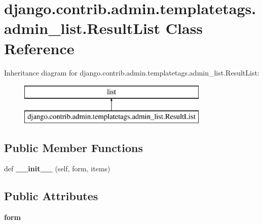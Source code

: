 \hypertarget{classdjango_1_1contrib_1_1admin_1_1templatetags_1_1admin__list_1_1_result_list}{}\section{django.\+contrib.\+admin.\+templatetags.\+admin\+\_\+list.\+Result\+List Class Reference}
\label{classdjango_1_1contrib_1_1admin_1_1templatetags_1_1admin__list_1_1_result_list}
Inheritance diagram for django.\+contrib.\+admin.\+templatetags.\+admin\+\_\+list.\+Result\+List\+:\begin{figure}[H]
\begin{center}
\leavevmode
\includegraphics[height=2.000000cm]{classdjango_1_1contrib_1_1admin_1_1templatetags_1_1admin__list_1_1_result_list}
\end{center}
\end{figure}
\subsection*{Public Member Functions}
\begin{DoxyCompactItemize}
\item 
\mbox{\label{classdjango_1_1contrib_1_1admin_1_1templatetags_1_1admin__list_1_1_result_list_a7fb57218eecbcbcabe01690af168d3c1}} 
def {\bfseries \+\_\+\+\_\+init\+\_\+\+\_\+} (self, form, items)
\end{DoxyCompactItemize}
\subsection*{Public Attributes}
\begin{DoxyCompactItemize}
\item 
\mbox{\label{classdjango_1_1contrib_1_1admin_1_1templatetags_1_1admin__list_1_1_result_list_a2ec5e6bf0f1d960e470cd0c1fae3ebf4}} 
{\bfseries form}
\end{DoxyCompactItemize}


